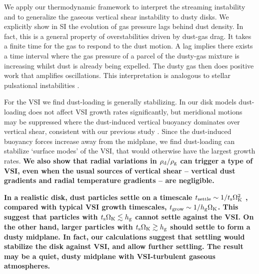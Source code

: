 

We  apply our thermodynamic framework to interpret
the streaming instability \citep[SI, ][]{youdin05a,jacquet11} and to generalize the gaseous vertical shear
instability \citep[VSI, ][]{nelson13,lin15} to dusty disks. We 
explicitly show in SI the evolution of gas 
pressure lags behind dust density. In fact, this is a general property of 
overstabilities driven by dust-gas drag. 
It takes a finite time for the gas to respond to
the dust motion. A lag implies there exists a time interval where 
the gas pressure of a parcel of the dusty-gas mixture is increasing whilst dust is already being expelled.  
The dusty gas then does positive work that amplifies 
oscillations. This interpretation is analogous to stellar pulsational
instabilities \citep{cox67}. 

For the VSI we find dust-loading is generally stabilizing. In our disk models 
dust-loading does not affect VSI growth rates significantly, but
meridional motions may be suppressed where the dust-induced
vertical buoyancy dominates over vertical shear, consistent with our
previous study \citep{lin15}. 
Since the dust-induced buoyancy forces
increase away from the midplane, we find dust-loading can stabilize
`surface modes'  of the VSI, that would otherwise have the largest
growth rates. {\bf We also show that radial variations in
  $\rho_\mathrm{d}/\rho_\mathrm{g}$ can trigger a type of VSI, even when the 
  usual sources of vertical shear -- vertical dust gradients and radial 
  temperature gradients -- are negligible.  
}  

{\bf In a realistic disk, dust particles settle on a timescale $
  t_\mathrm{settle} \sim 1/t_\mathrm{s}\Omega_{\rm K}^2$ \citep{takeuchi02}, compared 
  with typical VSI growth timescales, $t_\mathrm{grow}\sim 
  1/h_\mathrm{g}\Omega_{\rm K}$. This suggest that particles with $t_\mathrm{s}\Omega_{\rm K}\lesssim 
  h_\mathrm{g}$ cannot settle against the VSI. On the 
  other hand, larger particles with $t_\mathrm{s}\Omega_{\rm K}\gtrsim h_\mathrm{g}$ should
  settle to form a dusty midplane. In fact, our calculations suggest that
  settling would stabilize the disk against VSI, and allow
  further settling. The result may be a quiet, dusty midplane \citep[unless non-axisymmetric
  instabilities develop, ][]{chiang08} with VSI-turbulent gaseous
  atmospheres. 
}


